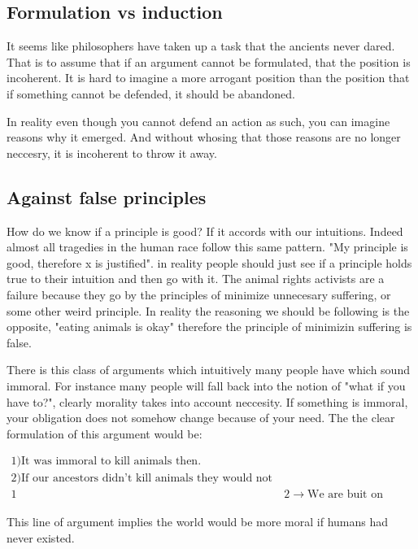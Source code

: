 \documentclass[12pt]{report}
\numberwithin{equation}{section}
\begin{document}
\subsection{Formulation vs induction}
It seems like philosophers have taken up a task that the ancients never dared. That is to assume that if an argument cannot be formulated, that the position is incoherent. It is hard to imagine a more arrogant position than the position that if something cannot be defended, it should be abandoned. 

In reality even though you cannot defend an action as such, you can imagine reasons why it emerged. And without whosing that those reasons are no longer neccesry, it is incoherent to throw it away. 

\subsection{Against false principles}

How do we know if a principle is good? If it accords with our intuitions. Indeed almost all tragedies in the human race follow this same pattern. "My principle is good, therefore x is justified". in reality people should just see if a principle holds true to their intuition and then go with it. The animal rights activists are a failure because they go by the principles of minimize unnecesary suffering, or some other weird principle. In reality the reasoning we should be following is the opposite, "eating animals is okay" therefore the principle of minimizin suffering is false. 

There is this class of arguments which intuitively many people have which sound immoral. For instance many people will fall back into the notion of "what if you have to?", clearly morality takes into account neccesity. If something is immoral, your obligation does not somehow change because of your need. The the clear formulation of this argument would be:

\begin{align}
1) \text{It was immoral to kill animals then.} \\
2) \text{If our ancestors didn't kill animals they would not have evolved as they did} \\
1&2 \rightarrow \text{We are buit on immorality}
\end{align}

This line of argument implies the world would be more moral if humans had never existed. 




 


\end{document}
